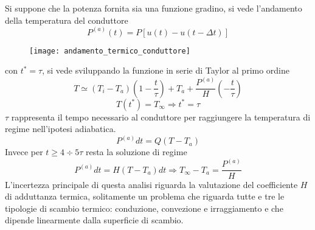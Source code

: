 Si suppone che la potenza fornita sia una funzione gradino, si vede l'andamento della
temperatura del conduttore
$$
P^{(a)}(t) = P \left[u(t) - u(t-\Delta t)\right]
$$
\begin{figure}[H]
\centering
\texttt{[image: andamento\_termico\_conduttore]}
\end{figure}
con $t^* = \tau$, si vede sviluppando la funzione in serie di Taylor al primo ordine
$$
T \simeq (T_i - T_a)\left(1-\frac{t}{\tau}\right) + T_a + \frac{P^{(a)}}{H}\left(-\frac{t}{\tau}\right)
$$
$$
T(t^*) = T_\infty \Rightarrow t^* = \tau
$$
$\tau$ rappresenta il tempo necessario al conduttore per raggiungere la temperatura 
di regime nell'ipotesi adiabatica. 
$$
P^{(a)} dt = Q(T-T_a)
$$
Invece per $t\geq 4\div 5 \tau$ resta la soluzione di regime
$$
P^{(a)}dt = H(T-T_a)dt \Rightarrow T_\infty - T_a = \frac{P^{(a)}}{H}
$$
L'incertezza principale di questa analisi riguarda la valutazione del coefficiente
$H$ di adduttanza termica, solitamente un problema che riguarda tutte e tre le tipologie
di scambio termico: conduzione, convezione e irraggiamento e che dipende linearmente
dalla superficie di scambio.

